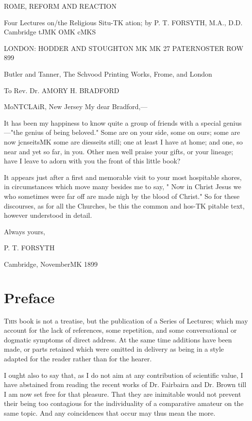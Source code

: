 \documentclass[12pt,a5paper,twoside]{book}
\begin{document}


ROME, REFORM 
AND REACTION 



Four Lectures on/the Religious Situ-TK
ation; by P. T. FORSYTH, M.A., D.D. 
Cambridge tJMK OMK cMKS 



LONDON: HODDER AND 
STOUGHTON MK MK 27 
PATERNOSTER ROW 899 



Butler and Tanner, The Schvood Printing Works, Frome, and London 



To 
Rev. Dr. AMORY H. BRADFORD 

MoNTCLAiR, New Jersey 
My dear Bradford,---

It has been my happiness to know quite a 
group of friends with a special genius---"the genius 
of being beloved." Some are on your side, some on 
ours; some are now jcnseitsMK some are diesseits still; 
one at least I have at home; and one, so near and 
yet so far, in you. Other men well praise your gifts, 
or your lineage; have I leave to adorn with you the 
front of this little book? 

It appears just after a first and memorable visit to 
your most hospitable shores, in circumstances which 
move many besides me to say, " Now in Christ 
Jesus we who sometimes were far off are made nigh 
by the blood of Christ." So for these discourses, as 
for all the Churches, be this the common and hos-TK
pitable text, however understood in detail. 

Always yours, 

P. T. FORSYTH 

Cambridge, NovemberMK 1899 



\chapter*{Preface} 

\textsc{This} book is not a treatise, but the publication 
of a Series of Lectures; which may account 
for the lack of references, some repetition, 
and some conversational or dogmatic 
symptoms of direct address. At the same time 
additions have been made, or parts retained 
which were omitted in delivery as being in 
a style adapted for the reader rather than for 
the hearer. 

I ought also to say that, as I do not aim 
at any contribution of scientific value, I have 
abstained from reading the recent works of 
Dr. Fairbairn and Dr. Brown till I am now 
set free for that pleasure. That they are 
inimitable would not prevent their being too 
contagious for the individuality of a comparative 
amateur on the same topic. And any 
coincidences that occur may thus mean the 
more. 
\end{document}

